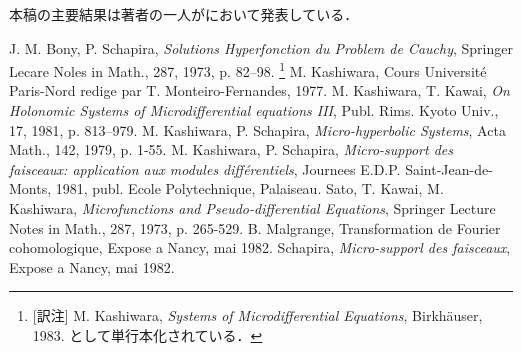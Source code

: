 本稿の主要結果は著者の一人が\cite{Sch82}において発表している．
\begin{thebibliography}{20}
     J. M. Bony, P. Schapira, 
        \emph{Solutions Hyperfonction du Problem de Cauchy}, 
        Springer Lecare Noles in Math., 287, 1973, p. 82--98.
    \footnote{[訳注] M. Kashiwara, \emph{Systems of Microdifferential Equations}, Birkh\"auser, 1983. として単行本化されている．} M. Kashiwara, 
        Cours Universit\'e Paris-Nord redige 
        par T. Monteiro-Fernandes, 1977.
     M. Kashiwara, T. Kawai, 
        \emph{On Holonomic Systems of Microdifferential equations III}, 
        Publ. Rims. Kyoto Univ., 17, 1981, p. 813--979.
     M. Kashiwara, P. Schapira, \emph{Micro-hyperbolic Systems}, 
        Acta Math., 142, 1979, p. 1-55.
     M. Kashiwara, P. Schapira, 
        \emph{Micro-support des faisceaux: application aux modules diff\'erentiels}, 
        Journees E.D.P. Saint-Jean-de-Monts, 1981, publ. Ecole Polytechnique, Palaiseau.
     Sato, T. Kawai, M. Kashiwara, 
        \emph{Microfunctions and Pseudo-differential Equations}, 
        Springer Lecture Notes in Math., 287, 1973, p. 265-529.
     B. Malgrange, Transformation de Fourier cohomologique, Expose a Nancy, mai 1982.
     Schapira, \emph{Micro-supporl des faisceaux}, 
        Expose a Nancy, mai 1982.
\end{thebibliography}

